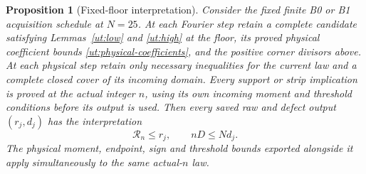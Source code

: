 \documentclass[aop,preprint]{imsart}
\newtheorem{proposition}[theorem]{Proposition}
\theoremstyle{definition}
\numberwithin{equation}{section}
\begin{document}
\begin{proposition}[Fixed-floor interpretation]\label{ut:transfer}
Consider the fixed finite B0 or B1 acquisition schedule at $N=25$.
At each Fourier step retain a complete candidate satisfying
Lemmas~\ref{ut:low} and \ref{ut:high} at the floor, its proved
physical coefficient bounds \eqref{ut:physical-coefficients}, and
the positive corner divisors above. At each physical step retain only
necessary inequalities for the current law and a complete closed
cover of its incoming domain. Every support or strip implication is
proved at the actual integer $n$, using its own incoming moment and
threshold conditions before its output is used.
Then every saved raw and defect output $(r_j,d_j)$ has the interpretation
\begin{equation}\label{ut:induction-invariant}
 \mathcal R_n\le r_j,\qquad nD\le Nd_j.
\end{equation}
The physical moment, endpoint, sign and threshold bounds exported
alongside it apply simultaneously to the same actual-$n$ law.
\end{proposition}
\end{document}
